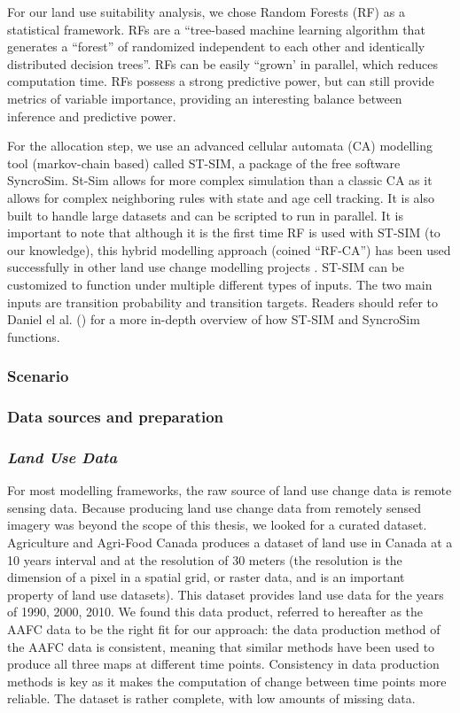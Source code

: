 For our land use suitability analysis, we chose Random Forests (RF) as a statistical framework. RFs are a “tree-based machine learning algorithm that generates a “forest” of randomized independent to each other and identically distributed decision trees”. RFs can be easily “grown’ in parallel, which reduces computation time. RFs possess a strong predictive power, but can still provide metrics of variable importance, providing an interesting balance between inference and predictive power.

For the allocation step, we use an advanced cellular automata (CA) modelling tool (markov-chain based) called ST-SIM, a package of the free software SyncroSim. St-Sim allows for more complex simulation than a classic CA as it allows for complex neighboring rules with state and age cell tracking. It is also built to handle large datasets and can be scripted to run in parallel. It is important to note that although it is the first time RF is used with ST-SIM (to our knowledge), this hybrid modelling approach (coined “RF-CA”) has been used successfully in other land use change modelling projects \citep{kamusoko_simulating_2015, gounaridis_random_2019}. ST-SIM can be customized to function under multiple different types of inputs. The two main inputs are transition probability and transition targets. Readers should refer to Daniel el al. (\citeyear{daniel_state-and-transition_2016}) for a more in-depth overview of how ST-SIM and SyncroSim functions. \\

\subsubsection{Scenario }

\subsubsection{Data sources and preparation}

\subsubsection*{\textit{Land Use Data}}
For most modelling frameworks, the raw source of land use change data is remote sensing data. Because producing land use change data from remotely sensed imagery was beyond the scope of this thesis, we looked for a curated dataset. Agriculture and Agri-Food Canada produces a dataset of land use in Canada at a 10 years interval and at the resolution of 30 meters (the resolution is the dimension of a pixel in a spatial grid, or raster data, and is an important property of land use datasets). This dataset provides land use data for the years of 1990, 2000, 2010. We found this data product, referred to hereafter as the AAFC data  to be the right fit for our approach: the data production method of the AAFC  data is consistent, meaning that similar methods have been used to produce all three maps at different time points. Consistency in data production methods is key as it makes the computation of change between time points more reliable. The dataset is rather complete, with low amounts of missing data.


